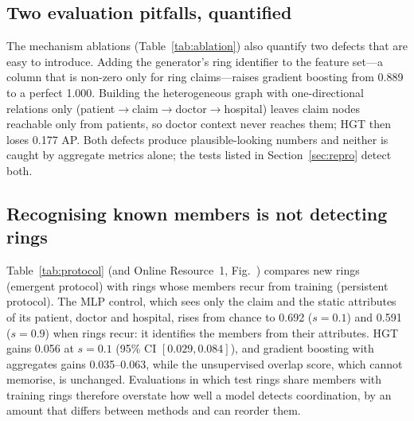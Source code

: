 \documentclass[pdflatex,sn-vancouver-num]{sn-jnl}
\begin{document}
\subsection{Two evaluation pitfalls, quantified}
The mechanism ablations (Table~\ref{tab:ablation}) also quantify two defects that are easy to introduce. Adding
the generator's ring identifier to the feature set---a column that is
non-zero only for ring claims---raises gradient boosting from 0.889 to a
perfect 1.000. Building the heterogeneous graph with one-directional
relations only (patient$\to$claim$\to$doctor$\to$hospital) leaves claim nodes
reachable only from patients, so doctor context never reaches them; HGT then
loses 0.177 AP. Both defects produce plausible-looking numbers and neither is
caught by aggregate metrics alone; the tests listed in
Section~\ref{sec:repro} detect both.

\subsection{Recognising known members is not detecting rings}
Table~\ref{tab:protocol} (and Online Resource~1, Fig.~\SFigProtocol) compares new rings (emergent protocol) with rings
whose members recur from training (persistent protocol). The MLP control,
which sees only the claim and the static attributes of its patient, doctor
and hospital, rises from chance to 0.692 ($s=0.1$) and 0.591 ($s=0.9$) when
rings recur: it identifies the members from their attributes. HGT gains
0.056 at $s=0.1$ (95\% CI $[0.029, 0.084]$), and gradient boosting with
aggregates gains 0.035--0.063, while the unsupervised overlap score, which
cannot memorise, is unchanged. Evaluations in which test rings share members
with training rings therefore overstate how well a model detects
coordination, by an amount that differs between methods and can reorder
them.
\end{document}
